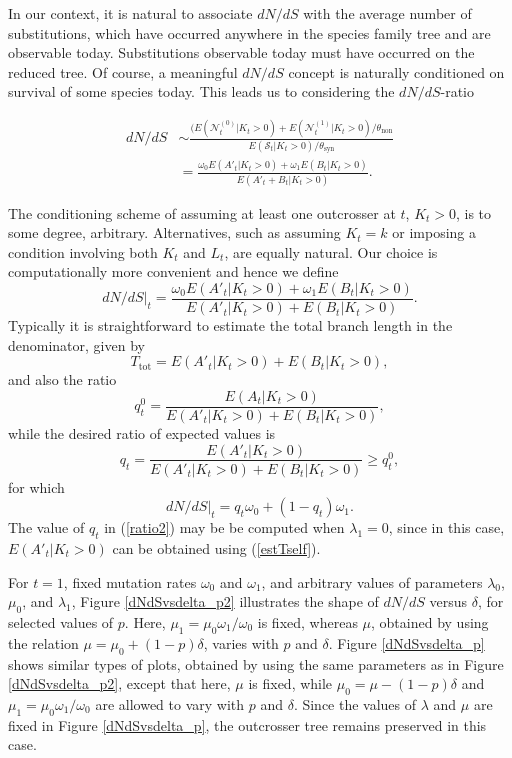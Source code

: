 \documentclass[a4paper,11pt]{article}
\theoremstyle{plain}
\theoremstyle{definition}
\numberwithin{equation}{section}
\begin{document}
In our context, it is natural to associate $dN/dS$ with the average
number of substitutions, which have occurred anywhere in the species
family tree and are observable today.  Substitutions observable
today must have occurred on the reduced tree.  Of course, a meaningful
$dN/dS$ concept is naturally conditioned on survival of some species
today. This leads us to considering the $dN/dS$-ratio


\begin{align*}
dN/dS
&\sim\frac{(E(\mathcal{N}_t^{(0)}|K_t>0)+E(\mathcal{N}_t^{(1)}|K_t>0)/\theta_\mathrm{non}}
{E(\mathcal{S}_t|K_t>0)/\theta_\mathrm{syn}}\nonumber\\
&=\frac{\omega_0E(A'_t|K_t>0)+\omega_1E(B_t|K_t>0)}
{E(A'_t+B_t|K_t>0)}. 
\end{align*}



\noindent The conditioning scheme of assuming at least one outcrosser at $t$,
$K_t>0$, is to some degree, arbitrary. Alternatives, such as assuming
$K_t=k$ or imposing a condition involving both $K_t$ and $L_t$, are
equally natural. Our choice is computationally more convenient and
hence we define
\[ 
dN/dS|_t=\frac{\omega_0E(A'_t|K_t>0)+\omega_1E(B_t|K_t>0)}
{E(A'_t|K_t>0)+E(B_t|K_t>0)}.
\] 
Typically it is straightforward to estimate the total branch length in the
denominator, given by  
\[
T_\mathrm{tot}=E(A'_t|K_t>0)+E(B_t|K_t>0),
\]
and also the ratio
\begin{equation}
q^0_t=\frac{E(A_t|K_t>0)}{E(A'_t|K_t>0)+E(B_t|K_t>0)},
\label{ratio}
\end{equation}
while the desired ratio of expected values is
\begin{equation}
q_t=\frac{E(A'_t|K_t>0)}{E(A'_t|K_t>0)+E(B_t|K_t>0)}\ge q^0_t,
\label{ratio2}
\end{equation}
for which 
\[
dN/dS|_t=q_t \omega_0+(1-q_t)\omega_1.
\]
The value of $q_t$ in (\ref{ratio2}) may be be computed
when $\lambda_1=0$, since in this case, $E(A'_t|K_t>0)$ can be 
obtained using (\ref{estTself}). 

For $t=1$, fixed mutation rates $\omega_0$ and $\omega_1$,
and arbitrary values of parameters $\lambda_0$, $\mu_0$, and 
$\lambda_1$, Figure \ref{dNdSvsdelta_p2} illustrates the shape of 
$dN/dS$ versus $\delta$, for selected values of $p$. Here, 
$\mu_1=\mu_0\omega_1/\omega_0$ is fixed, whereas 
$\mu$, obtained by using the relation $\mu=\mu_0+(1-p)\delta$, 
varies with $p$ and $\delta$.  
Figure \ref{dNdSvsdelta_p} shows similar types of plots, 
obtained by using the same parameters as in Figure \ref{dNdSvsdelta_p2}, 
except that here, $\mu$ is fixed, while 
$\mu_0=\mu-(1-p)\delta$ and $\mu_1=\mu_0\omega_1/\omega_0$ 
are allowed to vary with $p$ and $\delta$. Since the values of 
$\lambda$ and $\mu$ are fixed in Figure \ref{dNdSvsdelta_p}, 
the outcrosser tree remains preserved in this case.
\end{document}
